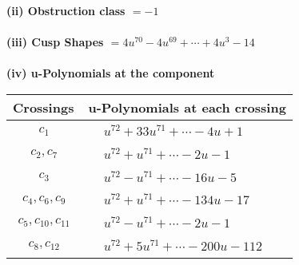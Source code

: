 \documentclass[1p]{elsarticle_modified}
\theoremstyle{definition}
\begin{document}
\flushleft \textbf{(ii) Obstruction class $= -1$}\\~\\
\flushleft \textbf{(iii) Cusp Shapes $= 4 u^{70}-4 u^{69}+\cdots+4 u^3-14$}\\~\\
\newpage\renewcommand{\arraystretch}{1}
\flushleft \textbf{(iv) u-Polynomials at the component}\newline \\
\begin{tabular}{m{50pt}|m{274pt}}
Crossings & \hspace{64pt}u-Polynomials at each crossing \\
\hline $$\begin{aligned}c_{1}\end{aligned}$$&$\begin{aligned}
&u^{72}+33 u^{71}+\cdots-4 u+1
\end{aligned}$\\
\hline $$\begin{aligned}c_{2},c_{7}\end{aligned}$$&$\begin{aligned}
&u^{72}+u^{71}+\cdots-2 u-1
\end{aligned}$\\
\hline $$\begin{aligned}c_{3}\end{aligned}$$&$\begin{aligned}
&u^{72}- u^{71}+\cdots-16 u-5
\end{aligned}$\\
\hline $$\begin{aligned}c_{4},c_{6},c_{9}\end{aligned}$$&$\begin{aligned}
&u^{72}+u^{71}+\cdots-134 u-17
\end{aligned}$\\
\hline $$\begin{aligned}c_{5},c_{10},c_{11}\end{aligned}$$&$\begin{aligned}
&u^{72}- u^{71}+\cdots-2 u-1
\end{aligned}$\\
\hline $$\begin{aligned}c_{8},c_{12}\end{aligned}$$&$\begin{aligned}
&u^{72}+5 u^{71}+\cdots-200 u-112
\end{aligned}$\\
\hline
\end{tabular}\\~\\
\end{document}

